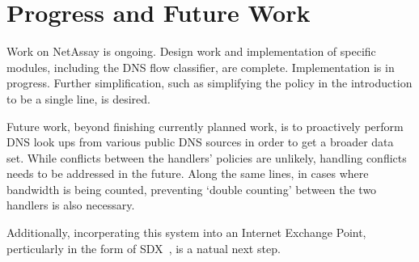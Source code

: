 \documentclass{sig-alternate}
\newcommand\system{NetAssay}
\begin{document}
\section{Progress and Future Work}
Work on \system{} is ongoing. Design work and implementation of specific modules, including the DNS flow classifier, are complete. Implementation is in progress. Further simplification, such as simplifying the policy in the introduction to be a single line, is desired.



Future work, beyond finishing currently planned work, is to proactively perform DNS look ups from various public DNS sources in order to get a broader data set. While conflicts between the handlers' policies are unlikely, handling conflicts needs to be addressed in the future. Along the same lines, in cases where bandwidth is being counted, preventing `double counting' between the two handlers is also necessary.

Additionally, incorperating this system into an Internet Exchange Point, perticularly in the form of SDX~\cite{sdx}, is a natual next step.





%

%
%
\end{document}
